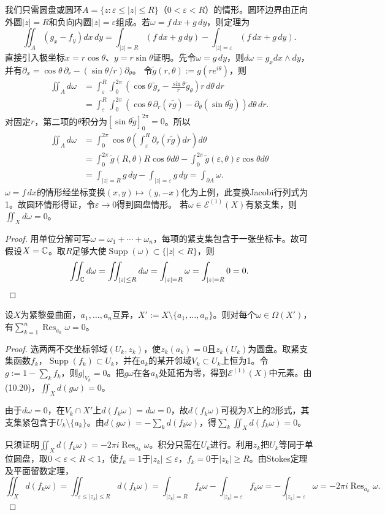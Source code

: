 我们只需圆盘或圆环$A=\{z:\varepsilon\le|z|\le R\}$（$0<\varepsilon<R$）的情形。圆环边界由正向外圆$|z|=R$和负向内圆$|z|=\varepsilon$组成。若$\omega=f\,dx+g\,dy$，则定理为
\[
\iint_A(g_x-f_y)dx\,dy=\int_{|z|=R}(f\,dx+g\,dy)-\int_{|z|=\varepsilon}(f\,dx+g\,dy).
\]
直接引入极坐标$x=r\cos\theta$、$y=r\sin\theta$证明。先令$\omega=g\,dy$，则$d\omega=g_xdx\wedge dy$，并有$\partial_x=\cos\theta\,\partial_r-(\sin\theta/r)\partial_\theta$。
令$\widetilde g(r,\theta):=g(re^{i\theta})$，则
\begin{align*}
\iint_A d\omega&=\int_\varepsilon^R\int_0^{2\pi}(\cos\theta\,\widetilde g_r-\tfrac{\sin\theta}r\widetilde g_\theta)r\,d\theta\,dr\\
&=\int_\varepsilon^R\int_0^{2\pi}\left(\cos\theta\,\partial_r(r\widetilde g)-\partial_\theta(\sin\theta\widetilde g)\right)d\theta\,dr.
\end{align*}
对固定$r$，第二项的$\theta$积分为$[\sin\theta\widetilde g]_0^{2\pi}=0$。所以
\begin{align*}
\iint_A d\omega&=\int_0^{2\pi}\cos\theta\left(\int_\varepsilon^R\partial_r(r\widetilde g)dr\right)d\theta\\
&=\int_0^{2\pi}\widetilde g(R,\theta)R\cos\theta d\theta-
\int_0^{2\pi}\widetilde g(\varepsilon,\theta)\varepsilon\cos\theta d\theta\\
&=\int_{|z|=R}g\,dy-\int_{|z|=\varepsilon}g\,dy=\int_{\partial A}\omega.
\end{align*}
$\omega=f\,dx$的情形经坐标变换$(x,y)\mapsto(y,-x)$化为上例，此变换Jacobi行列式为1。故圆环情形得证，令$\varepsilon\to0$得到圆盘情形。
若$\omega\in\mathcal E^{(1)}(X)$有紧支集，则$\iint_Xd\omega=0$。
\begin{proof}
用单位分解可写$\omega=\omega_1+\cdots+\omega_n$，每项的紧支集包含于一张坐标卡。故可假设$X=\mathbb C$。取$R$足够大使$\operatorname{Supp}(\omega)\subset\{|z|<R\}$，则
\[
\iint_\mathbb C d\omega=\iint_{|z|\le R}d\omega=\int_{|z|=R}\omega=\int_{|z|=R}0=0.
\]
\end{proof}
设$X$为紧黎曼曲面，$a_1,\ldots,a_n$互异，$X':=X\setminus\{a_1,\ldots,a_n\}$。则对每个$\omega\in\Omega(X')$，有$\sum_{k=1}^n\operatorname{Res}_{a_k}\omega=0$。
\begin{proof}
选两两不交坐标邻域$(U_k,z_k)$，使$z_k(a_k)=0$且$z_k(U_k)$为圆盘。取紧支集函数$f_k$，$\operatorname{Supp}(f_k)\subset U_k$，并在$a_k$的某开邻域$V_k\subset U_k$上恒为1。令$g:=1-\sum_kf_k$，则$g|_{V_k}=0$。把$g\omega$在各$a_k$处延拓为零，得到$\mathcal E^{(1)}(X)$中元素。由(10.20)，$\iint_Xd(g\omega)=0$。

由于$d\omega=0$，在$V_k\cap X'$上$d(f_k\omega)=d\omega=0$，故$d(f_k\omega)$可视为$X$上的2形式，其支集紧包含于$U_k\setminus\{a_k\}$。由$d(g\omega)=-\sum_kd(f_k\omega)$，得$\sum_k\iint_Xd(f_k\omega)=0$。

只须证明$\iint_Xd(f_k\omega)=-2\pi i\operatorname{Res}_{a_k}\omega$。积分只需在$U_k$进行。利用$z_k$把$U_k$等同于单位圆盘，取$0<\varepsilon<R<1$，使$f_k=1$于$|z_k|\le\varepsilon$，$f_k=0$于$|z_k|\ge R$。由Stokes定理及平面留数定理，
\[
\iint_Xd(f_k\omega)=\iint_{\varepsilon\le|z_k|\le R}d(f_k\omega)
=\int_{|z_k|=R}f_k\omega-\int_{|z_k|=\varepsilon}f_k\omega
=-\int_{|z_k|=\varepsilon}\omega=-2\pi i\operatorname{Res}_{a_k}\omega.
\]
\end{proof}
